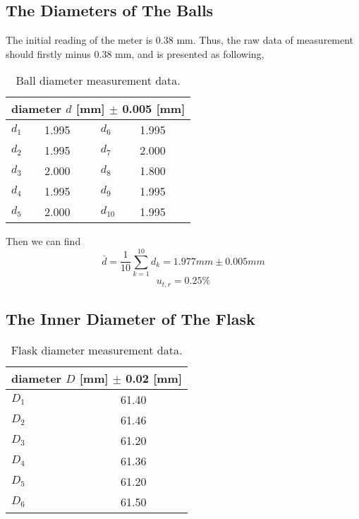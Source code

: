\subsection{The Diameters of The Balls}

The initial reading of the meter is 0.38 mm.
Thus, the raw data of measurement should firstly minus 0.38 mm, and is presented
as following, 

\begin{table}[H]
  \centering
  \begin{tabular}{|p{2cm}|p{3cm}||p{2cm} |p{3cm} |}
    \hline
    \multicolumn{4}{|c|}{diameter $d$ [mm] $\pm$ 0.005 [mm]  } \\
    \hline
    $d_1$ & 1.995 & $d_6$ & 1.995 \\ \hline
    $d_2$ & 1.995 & $d_7$ & 2.000 \\ \hline
    $d_3$ & 2.000 & $d_8$ & 1.800 \\ \hline
    $d_4$ & 1.995 & $d_9$ & 1.995 \\ \hline
    $d_5$ & 2.000 & $d_{10}$ & 1.995 \\ \hline
  \end{tabular}
  \caption{Ball diameter measurement data.}
\end{table}

Then we can find
$$  \bar{d} = \frac{1}{10} \sum_{k=1}^{10} d_k = 1.977  mm \pm  0.005 mm   $$
$$  u_{t,r} =  0.25 \%  $$ 

\subsection{The Inner Diameter of The Flask}

\begin{table}[H]
  \centering
  \begin{tabular}{|p{1cm}|c|}
    \hline
    \multicolumn{2}{|c|}{diameter $D$ [mm] $\pm$ 0.02 [mm]  } \\
    \hline
    $D_1$ & 61.40 \\ \hline
    $D_2$ & 61.46 \\ \hline
    $D_3$ & 61.20 \\ \hline
    $D_4$ & 61.36 \\ \hline
    $D_5$ & 61.20 \\ \hline
    $D_6$ & 61.50 \\ \hline
  \end{tabular}
  \caption{Flask diameter measurement data.}
\end{table}


